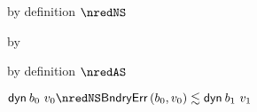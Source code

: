 {\begin{lamportproof*}
    \begin{pfproof}
        \begin{pfproof}
            \begin{pfproof}
              by definition $\nredNS$
            \end{pfproof}
            \begin{pfproof}
              by 
            \end{pfproof}
            \begin{pfproof}
              by definition $\nredAS$
            \end{pfproof}
          \qedstep
            \begin{pfproof}
              \begin{mathpar}
              \end{mathpar}
            \end{pfproof}
        \end{pfproof}
        \begin{pfproof}
          \qedstep
            \begin{pfproof}
              $\edynb{\sbnd_0}{\svalue_0} \nredNS \rexpr{\boundaryerror{\sbnd_0}{\svalue_0}}{\edynb{\sbnd_1}{\svalue_1}}$
            \end{pfproof}
        \end{pfproof}
    \end{pfproof}

\end{lamportproof*}}

